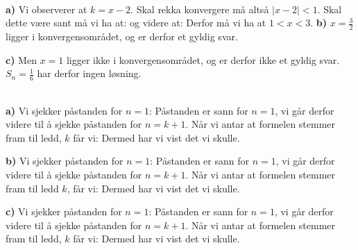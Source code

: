  \\
\textbf{a)} Vi observerer at ${ k=x-2} $. Skal rekka konvergere må altså $ {|x-2|<1} $. Skal dette være sant må vi ha at:
og videre at:
Derfor må vi ha at $ {1<x<3} $.
\newpage
\textbf{b)} 
$  {x=\frac{3}{2}} $ ligger i konvergensområdet, og er derfor et gyldig svar.

\textbf{c)} 
Men $  {x=1} $ ligger ikke i konvergensområdet, og er derfor ikke et gyldig svar. $ S_n=\frac{1}{6} $ har derfor ingen løsning.

\\
\textbf{a)} Vi sjekker påstanden for $ {n=1}$:
Påstanden er sann for $ {n=1} $, vi går derfor videre til å sjekke påstanden for $ {n=k+1} $. Når vi antar at formelen stemmer fram til ledd, $ k $ får vi:
Dermed har vi vist det vi skulle.

\textbf{b)} Vi sjekker påstanden for $ {n=1} $:
Påstanden er sann for $ n=1 $, vi går derfor videre til å sjekke påstanden for $ n=k+1 $. Når vi antar at formelen stemmer fram til ledd $ k $, får vi:
Dermed har vi vist det vi skulle.

\textbf{c)} 
Vi sjekker påstanden for $ {n=1}$:
Påstanden er sann for $ {n=1} $, vi går derfor videre til å sjekke påstanden for $ {n=k+1} $. Når vi antar at formelen stemmer fram til ledd, $ k $ får vi:
Dermed har vi vist det vi skulle.

